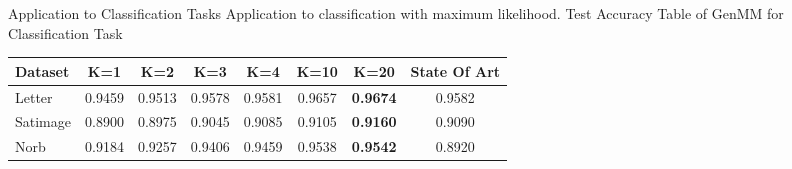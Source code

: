 \begin{frame}[label=current]{Application to Classification Tasks}
  Application to classification with maximum likelihood. Test Accuracy Table of GenMM for Classification Task
  \begin{table}
    \centering
    \begin{tabular}{lccccccc} \toprule
      {Dataset} &  K=1 &  K=2 &  K=3 &  K=4 & K=10 & K=20 & State Of Art \\ \midrule
      Letter & 0.9459 &  0.9513 & 0.9578  & 0.9581 & 0.9657 & \textbf{0.9674} & {0.9582}  \\ \midrule
      Satimage & 0.8900 & 0.8975 & 0.9045 & 0.9085 & 0.9105 & \textbf{0.9160} & 0.9090    \\ \midrule
      Norb & 0.9184 & 0.9257 & 0.9406 & 0.9459 & 0.9538 & \textbf{0.9542} & 0.8920   \\
      \bottomrule
    \end{tabular}

  \end{table}
\end{frame}

